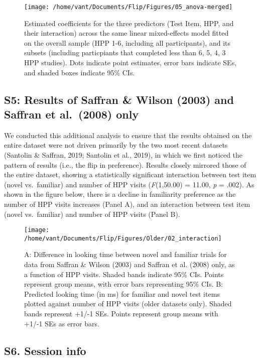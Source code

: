 \documentclass[
  english,
  man,man,floatsintext]{apa6}
\begin{document}
\begin{appendix}
\begin{figure}
\texttt{[image: /home/vant/Documents/Flip/Figures/05\_anova-merged]} \caption{Estimated coefficients for the three predictors (Test Item, HPP, and their interaction) across the same linear mixed-effects model fitted on the overall sample (HPP 1-6, including all participants), and its subsets (including particpiants that completed less than 6, 5, 4, 3 HPP studies). Dots indicate point estimates, error bars indicate SEs, and shaded boxes indicate 95\% CIs.}\label{fig:unnamed-chunk-18}
\end{figure}

\hypertarget{s5}{%
\subsection{S5: Results of Saffran \& Wilson (2003) and Saffran et
al.~(2008) only}\label{s5}}

We conducted this additional analysis to ensure that the results
obtained on the entire dataset were not driven primarily by the two most
recent datasets (Santolin \& Saffran, 2019; Santolin et al., 2019), in
which we first noticed the pattern of results (i.e., the flip in
preference). Results closely mirrored those of the entire dataset,
showing a statistically significant interaction between test item (novel
vs.~familiar) and number of HPP visits (\emph{F}(1,50.00) = 11.00,
\emph{p} = .002). As shown in the figure below, there is a decline in
familiarity preference as the number of HPP visits increases (Panel A),
and an interaction between test item (novel vs.~familiar) and number of
HPP visits (Panel B).

\begin{figure}
\texttt{[image: /home/vant/Documents/Flip/Figures/Older/02\_interaction]} \caption{A: Difference in looking time between novel and familiar trials for data from Saffran \& Wilson (2003) and Saffran et al. (2008) only, as a function of HPP visits. Shaded bands indicate 95\% CIs. Points represent group means, with error bars representing 95\% CIs. B: Predicted looking time (in ms) for familiar and novel test items plotted against number of HPP visits (older datasets only). Shaded bands represent +1/-1 SEs. Points represent group means with +1/-1 SEs as error bars.}\label{fig:unnamed-chunk-19}
\end{figure}

\hypertarget{s6.-session-info}{%
\subsection*{S6. Session info}\label{s6.-session-info}}


\end{appendix}
\end{document}
